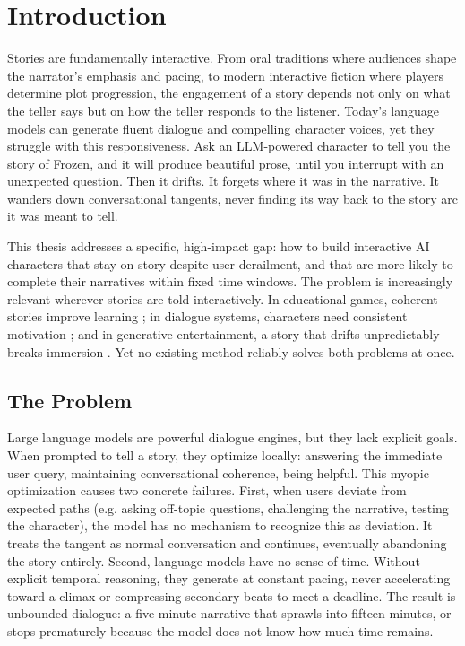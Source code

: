 \setcounter{chapter}{0}

\chapter{Introduction}\label{sec:introduction}

Stories are fundamentally interactive. From oral traditions where audiences shape the narrator's emphasis and pacing, to modern interactive fiction where players determine plot progression, the engagement of a story depends not only on what the teller says but on how the teller responds to the listener. Today's language models can generate fluent dialogue and compelling character voices, yet they struggle with this responsiveness. Ask an LLM-powered character to tell you the story of Frozen, and it will produce beautiful prose, until you interrupt with an unexpected question. Then it drifts. It forgets where it was in the narrative. It wanders down conversational tangents, never finding its way back to the story arc it was meant to tell.

This thesis addresses a specific, high-impact gap: how to build interactive AI characters that stay on story despite user derailment, and that are more likely to complete their narratives within fixed time windows. The problem is increasingly relevant wherever stories are told interactively. In educational games, coherent stories improve learning \cite{rowe2011integrating}; in dialogue systems, characters need consistent motivation \cite{pal2025beyond}; and in generative entertainment, a story that drifts unpredictably breaks immersion \cite{mateas2003facade}. Yet no existing method reliably solves both problems at once.

\section*{The Problem}

Large language models are powerful dialogue engines, but they lack explicit goals. When prompted to tell a story, they optimize locally: answering the immediate user query, maintaining conversational coherence, being helpful. This myopic optimization causes two concrete failures. First, when users deviate from expected paths (e.g. asking off-topic questions, challenging the narrative, testing the character), the model has no mechanism to recognize this as deviation. It treats the tangent as normal conversation and continues, eventually abandoning the story entirely. Second, language models have no sense of time. Without explicit temporal reasoning, they generate at constant pacing, never accelerating toward a climax or compressing secondary beats to meet a deadline. The result is unbounded dialogue: a five-minute narrative that sprawls into fifteen minutes, or stops prematurely because the model does not know how much time remains.

